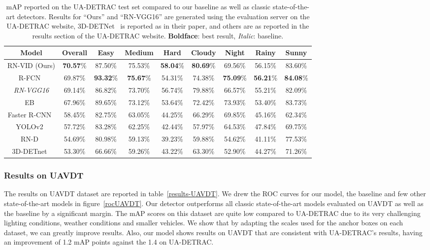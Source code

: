 \documentclass[runningheads]{llncs}
\begin{document}
\begin{table}[t]
\footnotesize
\setlength\tabcolsep{3pt} \def\arraystretch{1.5}
\centering
\caption{mAP reported on the UA-DETRAC test set compared to our baseline as well as classic state-of-the-art detectors. Results for ``Ours'' and ``RN-VGG16'' are generated using the evaluation server on the UA-DETRAC website, 3D-DETNet~\cite{3D_detnet_li20183d} is reported as in their paper, and others are as reported in the results section of the UA-DETRAC website. \textbf{Boldface}: best result, \textit{Italic}: baseline.}
\label{resultsuadetrac}
\begin{tabular}{c|c|c|c|c|c|c|c|c}
Model & Overall & Easy & Medium & Hard & Cloudy & Night & Rainy & Sunny \\
\hline
\hline
RN-VID (Ours) & \textbf{70.57}\% & 87.50\% & 75.53\% & \textbf{58.04}\% & \textbf{80.69}\% & 69.56\% & 56.15\% & 83.60\% \\
\hline 
R-FCN~\cite{RFCN_NIPS2016_6465} & 69.87\% &	\textbf{93.32}\% &	\textbf{75.67}\% &	54.31\% &	74.38\% &	\textbf{75.09}\% &	\textbf{56.21}\% &	\textbf{84.08}\% \\
\hline 
\textit{RN-VGG16} & 69.14\% & 86.82\% & 73.70\% & 56.74\% & 79.88\% & 66.57\% & 55.21\% & 82.09\% \\
\hline
EB~\cite{EB_wang2017evolving} & 67.96\%	& 89.65\% &	73.12\% & 53.64\% & 72.42\% & 73.93\% & 53.40\% & 83.73\% \\
\hline 
Faster R-CNN~\cite{ren2015faster} & 58.45\% &	82.75\% &	63.05\% &	44.25\% &	66.29\% &	69.85\% &	45.16\% &	62.34\% \\
\hline 
YOLOv2~\cite{Redmon_2017_CVPR_YOLO2} & 57.72\% &	83.28\% &	62.25\% &	42.44\% &	57.97\% &	64.53\% &	47.84\% &	69.75\% \\
\hline 
RN-D~\cite{perreault2019road} & 54.69\% &	80.98\% &	59.13\% &	39.23\% &	59.88\% &	54.62\% &	41.11\% &	77.53\% \\
\hline 
3D-DETnet~\cite{3D_detnet_li20183d} & 53.30\% &	66.66\% &	59.26\% &	43.22\% &	63.30\% &	52.90\% &	44.27\% &	71.26\% \\
\end{tabular}
\vspace{-4mm}
\end{table}

\subsubsection{Results on UAVDT}
The results on UAVDT dataset are reported in table~\ref{results-UAVDT}. We drew the ROC curves for our model, the baseline and few other state-of-the-art models in figure~\ref{rocUAVDT}. Our detector outperforms all classic state-of-the-art models evaluated on UAVDT as well as the baseline by a significant margin. The mAP scores on this dataset are quite low compared to UA-DETRAC due to its very challenging lighting conditions, weather conditions and smaller vehicles. We show that by adapting the scales used for the anchor boxes on each dataset, we can greatly improve results. Also, our model shows results on UAVDT that are consistent with UA-DETRAC's results, having an improvement of 1.2 mAP points against the 1.4 on UA-DETRAC.   
\end{document}
